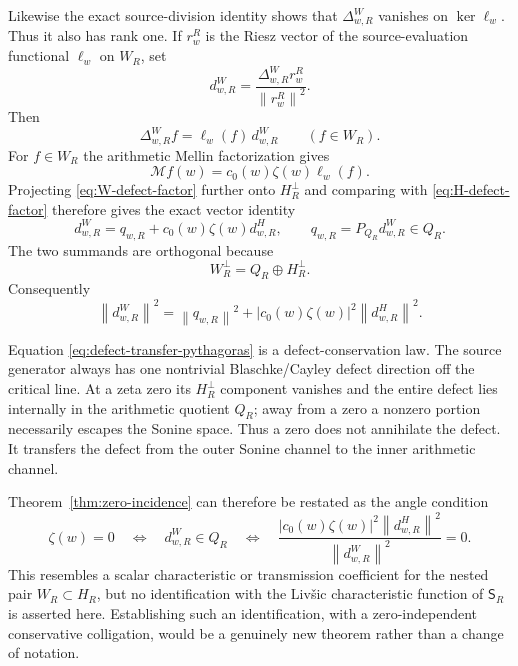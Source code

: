 \documentclass[11pt]{article}
\theoremstyle{remark}
\newcommand{\norm}[1]{\left\lVert #1\right\rVert}
\begin{document}
Likewise the exact source-division identity shows that $\Delta^W_{w,R}$ vanishes on $\ker\ell_w$.  Thus it also has rank one.  If $r_w^R$ is the Riesz vector of the source-evaluation functional $\ell_w$ on $W_R$, set
\[
 d^W_{w,R}=\frac{\Delta^W_{w,R}r_w^R}{\norm{r_w^R}^2}.
\]
Then
\begin{equation}\label{eq:W-defect-factor}
 \boxed{\Delta^W_{w,R}f=\ell_w(f)\,d^W_{w,R}\qquad(f\in W_R).}
\end{equation}
For $f\in W_R$ the arithmetic Mellin factorization gives
\[
 \mathcal M f(w)=c_0(w)\zeta(w)\ell_w(f).
\]
Projecting \eqref{eq:W-defect-factor} further onto $H_R^\perp$ and comparing with \eqref{eq:H-defect-factor} therefore gives the exact vector identity
\begin{equation}\label{eq:defect-transfer-vector}
 \boxed{
 d^W_{w,R}=q_{w,R}+c_0(w)\zeta(w)d^H_{w,R},
 \qquad q_{w,R}=P_{Q_R}d^W_{w,R}\in Q_R.
 }
\end{equation}
The two summands are orthogonal because
\[
 W_R^\perp=Q_R\oplus H_R^\perp.
\]
Consequently
\begin{equation}\label{eq:defect-transfer-pythagoras}
 \boxed{
 \norm{d^W_{w,R}}^2
 =\norm{q_{w,R}}^2
 +|c_0(w)\zeta(w)|^2\norm{d^H_{w,R}}^2.
 }
\end{equation}

Equation \eqref{eq:defect-transfer-pythagoras} is a defect-conservation law.  The source generator always has one nontrivial Blaschke/Cayley defect direction off the critical line.  At a zeta zero its $H_R^\perp$ component vanishes and the entire defect lies internally in the arithmetic quotient $Q_R$; away from a zero a nonzero portion necessarily escapes the Sonine space.  Thus a zero does not annihilate the defect.  It transfers the defect from the outer Sonine channel to the inner arithmetic channel.

Theorem~\ref{thm:zero-incidence} can therefore be restated as the angle condition
\begin{equation}\label{eq:defect-angle-zero}
 \zeta(w)=0
 \quad\Longleftrightarrow\quad
 d^W_{w,R}\in Q_R
 \quad\Longleftrightarrow\quad
 \frac{|c_0(w)\zeta(w)|^2\norm{d^H_{w,R}}^2}{\norm{d^W_{w,R}}^2}=0.
\end{equation}
This resembles a scalar characteristic or transmission coefficient for the nested pair $W_R\subset H_R$, but no identification with the Liv\v{s}ic characteristic function of $\mathsf S_R$ is asserted here.  Establishing such an identification, with a zero-independent conservative colligation, would be a genuinely new theorem rather than a change of notation.
\end{document}
